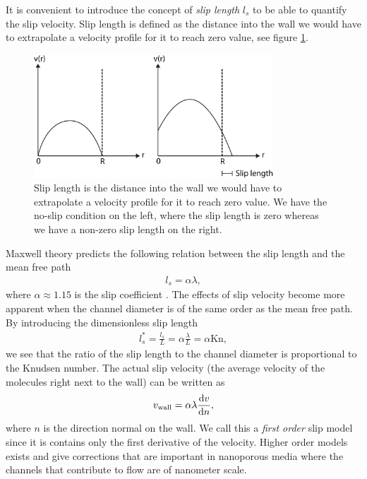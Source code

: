It is convenient to introduce the concept of \textit{slip length} $l_s$ to be able to quantify the slip velocity. Slip length is defined as the distance into the wall we would have to extrapolate a velocity profile for it to reach zero value, see figure \ref{fig:slip_length}.
\begin{figure}[h!]
\begin{center}
\includegraphics[width=0.8\textwidth, trim=0cm 0cm 0cm 0cm, clip]{DSMC/figures/slip_length.eps}
\end{center}
\caption{Slip length is the distance into the wall we would have to extrapolate a velocity profile for it to reach zero value. We have the no-slip condition on the left, where the slip length is zero whereas we have a non-zero slip length on the right.}
\label{fig:slip_length}
\end{figure}
Maxwell theory predicts the following relation between the slip length and the mean free path
\begin{align}
	\label{eq:noslip_sliplength}
	l_s = \alpha \lambda,
\end{align}
where $\alpha\approx 1.15$ is the slip coefficient \cite{morris1992slip}. The effects of slip velocity become more apparent when the channel diameter is of the same order as the mean free path. By introducing the dimensionless slip length
\begin{align}
	l_s^* = \frac{l_s}{ L} = \alpha \frac{\lambda }{ L} = \alpha \text{Kn},
\end{align}
we see that the ratio of the slip length to the channel diameter is proportional to the Knudsen number. The actual slip velocity (the average velocity of the molecules right next to the wall) can be written as
\begin{align}
	\label{eq:linear_slip_velocity}
	v_{\text{wall}} = \alpha\lambda\frac{\mathrm{d}v}{\mathrm{d}n},
\end{align}
where $n$ is the direction normal on the wall\cite{klinkenberg1941permeability}. We call this a \textit{first order} slip model since it is contains only the first derivative of the velocity. Higher order models exists and give corrections that are important in nanoporous media where the channels that contribute to flow are of nanometer scale.

